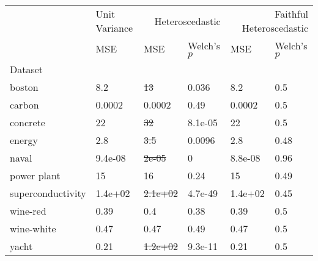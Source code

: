 \begin{tabular}{l|l|ll|ll}
\toprule
 & Unit Variance & \multicolumn{2}{r}{Heteroscedastic} & \multicolumn{2}{r}{Faithful Heteroscedastic} \\
 & MSE & MSE & Welch's $p$ & MSE & Welch's $p$ \\
Dataset &  &  &  &  &  \\
\midrule
boston & 8.2 & \sout{13} & 0.036 & 8.2 & 0.5 \\
carbon & 0.0002 & 0.0002 & 0.49 & 0.0002 & 0.5 \\
concrete & 22 & \sout{32} & 8.1e-05 & 22 & 0.5 \\
energy & 2.8 & \sout{3.5} & 0.0096 & 2.8 & 0.48 \\
naval & 9.4e-08 & \sout{2e-05} & 0 & 8.8e-08 & 0.96 \\
power plant & 15 & 16 & 0.24 & 15 & 0.49 \\
superconductivity & 1.4e+02 & \sout{2.1e+02} & 4.7e-49 & 1.4e+02 & 0.45 \\
wine-red & 0.39 & 0.4 & 0.38 & 0.39 & 0.5 \\
wine-white & 0.47 & 0.47 & 0.49 & 0.47 & 0.5 \\
yacht & 0.21 & \sout{1.2e+02} & 9.3e-11 & 0.21 & 0.5 \\
\bottomrule
\end{tabular}
